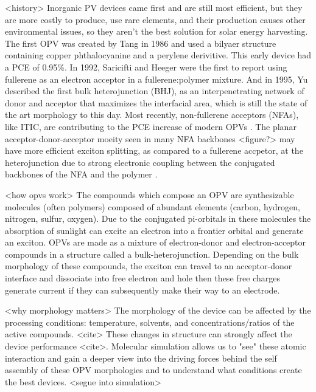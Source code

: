 <history>
Inorganic PV devices came first and are still most efficient, but they are more costly to produce, use rare elements, and their production causes other environmental issues, so they aren't the best solution for solar energy harvesting. 
The first OPV was created by Tang in 1986 and \cite{Tang1986b} used a bilyaer structure containing copper phthalocyanine and a perylene derivitive. 
This early device had a PCE of 0.95\%.
In 1992, Saricifti and Heeger\cite{Saricifti1992} were the first to report using fullerene as an electron acceptor in a fullerene:polymer mixture.
And in 1995, Yu described the first bulk heterojunction (BHJ), as an interpenetrating network of donor and acceptor that maximizes the interfacial area, which is still the state of the art morphology to this day\cite{Yu1995}.
Most recently, non-fullerene acceptors (NFAs), like ITIC, are contributing to the PCE increase of modern OPVs \cite{S.Gurney2019}.
The planar acceptor-donor-acceptor moeity seen in many NFA backbones <figure?> may have more efficient exciton splitting, as compared to a fullerene accpetor, at the heterojunction due to strong electronic coupling between the conjugated backbones of the NFA and the polymer \cite{Yi2018}.

<how opvs work>
The compounds which compose an OPV are synthesizable molecules (often polymers) composed of abundant elements (carbon, hydrogen, nitrogen, sulfur, oxygen).
Due to the conjugated pi-orbitals in these molecules the absorption of sunlight can excite an electron into a frontier orbital and generate an exciton.
OPVs are made as a mixture of electron-donor and electron-acceptor compounds in a structure called a bulk-heterojunction.
Depending on the bulk morphology of these compounds, the exciton can travel to an acceptor-donor interface and dissociate into free electron and hole then these free charges generate current if they can subsequently make their way to an electrode.

<why morphology matters>
The morphology of the device can be affected by the processing conditions: temperature, solvents, and concentrations/ratios of the active compounds. <cite>
These changes in structure can strongly affect the device performance <cite>.
Molecular simulation allows us to "see" these atomic interaction and gain a deeper view into the driving forces behind the self assembly of these OPV morphologies and to understand what conditions create the best devices.
<segue into simulation>

